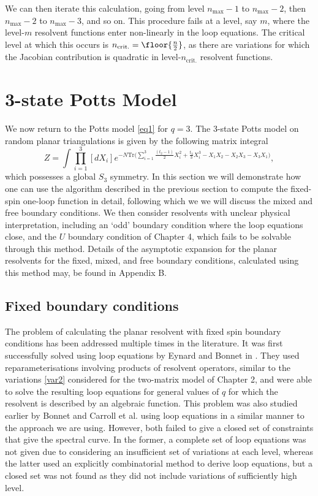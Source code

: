 We can then iterate this calculation, going from level $n_{\text{max}}-1$ to $n_{\text{max}}-2$,
then $n_{\text{max}}-2$ to $n_{\text{max}}-3$, and so on. This procedure fails at a level, say $m$,
where the level-$m$ resolvent functions enter non-linearly in the loop equations. The critical
level at which this occurs is $n_{\text{crit.}}=\floor{\frac{n}{2}}$, as there are variations for
which the Jacobian contribution is quadratic in level-$n_{\text{crit.}}$ resolvent functions.

\section{3-state Potts Model}

We now return to the Potts model \eqref{eq1} for $q=3$. The 3-state Potts model on random planar
triangulations is given by the following matrix integral
%
\begin{equation}
    \label{3PottsFixed}
    Z = \int \prod_{i=1}^3 [dX_i] e^{-N\text{Tr} \big( \sum_{i=1}^3 \frac{(t_2-1)}{2} X_i^2 + \frac{t_3}{3} X_i^3 - X_1 X_2 - X_2 X_3 - X_3 X_1\big)},
\end{equation}
%
which possesses a global $S_3$ symmetry. In this section we will demonstrate how one can use the
algorithm described in the previous section to compute the fixed-spin one-loop function in detail,
following which we we will discuss the mixed and free boundary conditions. We then consider
resolvents with unclear physical interpretation, including an `odd' boundary condition where the
loop equations close, and the $U$ boundary condition of Chapter 4, which fails to be solvable
through this method. Details of the asymptotic expansion for the planar resolvents for the fixed,
mixed, and free boundary conditions, calculated using this method may, be found in Appendix B.

\subsection{Fixed boundary conditions}
The problem of calculating the planar resolvent with fixed spin boundary conditions has been
addressed multiple times in the literature. It was first successfully solved using loop equations
by Eynard and Bonnet in \cite{Eynard:1999gp}. They used reparameterisations involving products of
resolvent operators, similar to the variations \eqref{var2} considered for the two-matrix model of
Chapter 2, and were able to solve the resulting loop equations for general values of $q$ for which
the resolvent is described by an algebraic function. This problem was also studied earlier by
Bonnet \cite{Bonnet:1999nf} and Carroll et al. \cite{Carroll:1995nj} using loop equations in a
similar manner to the approach we are using. However, both failed to give a closed set of
constraints that give the spectral curve. In the former, a complete set of loop equations was not
given due to considering an insufficient set of variations at each level, whereas the latter used
an explicitly combinatorial method to derive loop equations, but a closed set was not found as they
did not include variations of sufficiently high level.

